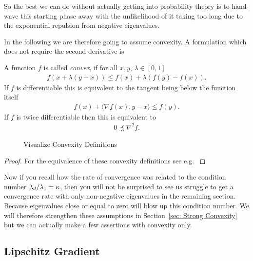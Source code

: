 So the best we can do without actually getting into probability theory is to
hand-wave this starting phase away with the unlikelihood of it taking too long
due to the exponential repulsion from negative eigenvalues.

In the following we are therefore going to assume convexity. A formulation which
does not require the second derivative is
%
\begin{definition}[Convexity]\label{def: convexity}
	A function \(f\) is called \emph{convex}, if for all \(x,y\), \(\lambda\in[0,1]\)
	\begin{align*}
		f(x + \lambda(y-x)) \le f(x) + \lambda (f(y)-f(x)).
	\end{align*}
	If \(f\) is differentiable this is equivalent to the tangent being below
	the function itself
	\begin{align*}
		f(x) + \langle\nabla f(x), y-x\rangle \le f(y).
	\end{align*}
	If \(f\) is twice differentiable then this is equivalent to
	\begin{align*}
		0\precsim\nabla^2 f.
	\end{align*}
 \end{definition}
%
\begin{figure}[h]
	\centering
	\def\svgwidth{1\textwidth}
	
	\caption{Visualize Convexity Definitions}
	\label{fig: visualize convexity definition}
\end{figure}
%
\begin{proof}
	For the equivalence of these convexity definitions see e.g. \textcite[Theorem
	2.1.2, 2.1.4]{nesterovLecturesConvexOptimization2018}
 \end{proof}
%
\begin{remark}
	Now if you recall how the rate of convergence was related to the condition number
	\(\lambda_d/\lambda_1 =\kappa\), then you will not be surprised to see us 
	struggle to get a convergence rate with only non-negative eigenvalues in 
	the remaining section. Because eigenvalues close or equal to zero will blow up this
	condition number. We will therefore strengthen these assumptions in
	Section~\ref{sec: Strong Convexity} but we can actually make a few assertions
	with convexity only.
\end{remark}

\subsection{Lipschitz Gradient}

